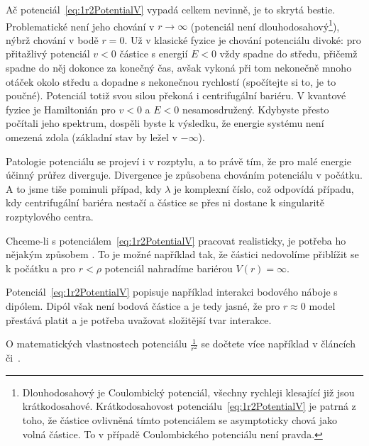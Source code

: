 \begin{note}
	Ač potenciál~\eqref{eq:1r2PotentialV} vypadá celkem nevinně, je to skrytá bestie.
	Problematické není jeho chování v $r\rightarrow\infty$ (potenciál není dlouhodosahový\footnote{
		Dlouhodosahový je Coulombický potenciál, všechny rychleji klesající již jsou krátkodosahové.
		Krátkodosahovost potenciálu~\eqref{eq:1r2PotentialV} je patrná z toho, že částice ovlivněná tímto potenciálem se asymptoticky chová jako volná částice. 
		To v případě Coulombického potenciálu není pravda.
	}), nýbrž chování v bodě $r=0$.
	Už v klasické fyzice je chování potenciálu divoké: pro přitažlivý potenciál $v<0$ částice s energií $E<0$ vždy spadne do středu, přičemž spadne do něj dokonce za konečný čas, avšak vykoná při tom nekonečně mnoho otáček okolo středu a dopadne s nekonečnou rychlostí (spočítejte si to, je to poučné).
	Potenciál totiž svou silou překoná i centrifugální bariéru.
	V kvantové fyzice je Hamiltonián pro $v<0$ a $E<0$ nesamosdružený.
	Kdybyste přesto počítali jeho spektrum, dospěli byste k výsledku, že energie systému není omezená zdola (základní stav by ležel v $-\infty$).

	Patologie potenciálu se projeví i v rozptylu, a to právě tím, že pro malé energie účinný průřez diverguje.
	Divergence je způsobena chováním potenciálu v počátku.
	A to jsme tiše pominuli případ, kdy $\lambda$ je komplexní číslo, což odpovídá případu, kdy centrifugální bariéra nestačí a částice se přes ni dostane k singularitě rozptylového centra.

	Chceme-li s potenciálem~\eqref{eq:1r2PotentialV} pracovat realisticky, je potřeba ho nějakým způsobem .
	To je možné například tak, že částici nedovolíme přiblížit se k počátku a pro $r<\rho$ potenciál nahradíme bariérou $V(r)=\infty$.

	Potenciál~\eqref{eq:1r2PotentialV} popisuje například interakci bodového náboje s dipólem.
	Dipól však není bodová částice a je tedy jasné, že pro $r\approx0$ model přestává platit a je potřeba uvažovat složitější tvar interakce.

	O matematických vlastnostech potenciálu $\frac{1}{r^{2}}$ se dočtete více například v článcích~\cite{Coon2002} či~\cite{Frank1971}.
\end{note}
